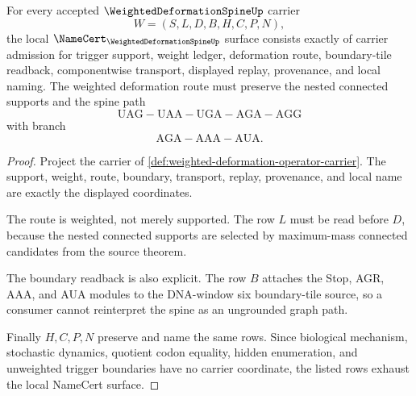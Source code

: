 \begin{theorem}
\label{thm:weighted-deformation-spine-namecert-obligations}
For every accepted $\WeightedDeformationSpineUp$ carrier
$$
W=(S,L,D,B,H,C,P,N),
$$
the local $\NameCert_{\WeightedDeformationSpineUp}$ surface consists exactly of carrier admission for trigger support, weight ledger, deformation route, boundary-tile readback, componentwise transport, displayed replay, provenance, and local naming. The weighted deformation route must preserve the nested connected supports and the spine path
$$
\mathrm{UAG}-\mathrm{UAA}-\mathrm{UGA}-\mathrm{AGA}-\mathrm{AGG}
$$
with branch
$$
\mathrm{AGA}-\mathrm{AAA}-\mathrm{AUA}.
$$
\end{theorem}
\begin{proof}
Project the carrier of \autoref{def:weighted-deformation-operator-carrier}. The support, weight, route, boundary, transport, replay, provenance, and local name are exactly the displayed coordinates.

The route is weighted, not merely supported. The row $L$ must be read before $D$, because the nested connected supports are selected by maximum-mass connected candidates from the source theorem.

The boundary readback is also explicit. The row $B$ attaches the Stop, AGR, AAA, and AUA modules to the DNA-window six boundary-tile source, so a consumer cannot reinterpret the spine as an ungrounded graph path.

Finally $H,C,P,N$ preserve and name the same rows. Since biological mechanism, stochastic dynamics, quotient codon equality, hidden enumeration, and unweighted trigger boundaries have no carrier coordinate, the listed rows exhaust the local NameCert surface.
\end{proof}

